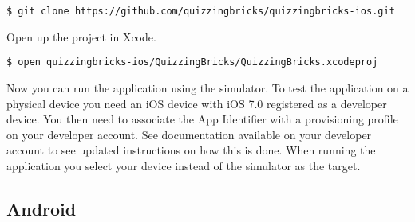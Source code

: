 \begin{verbatim}
$ git clone https://github.com/quizzingbricks/quizzingbricks-ios.git

\end{verbatim}

Open up the project in Xcode.

\begin{verbatim}
$ open quizzingbricks-ios/QuizzingBricks/QuizzingBricks.xcodeproj
\end{verbatim}

Now you can run the application using the simulator. To test the application on a physical device you need an iOS device with iOS 7.0 registered as a developer device. You then need to associate the App Identifier with a provisioning profile on your developer account. See documentation available on your developer account to see updated instructions on how this is done. When running the application you select your device instead of the simulator as the target.

\subsection{Android}